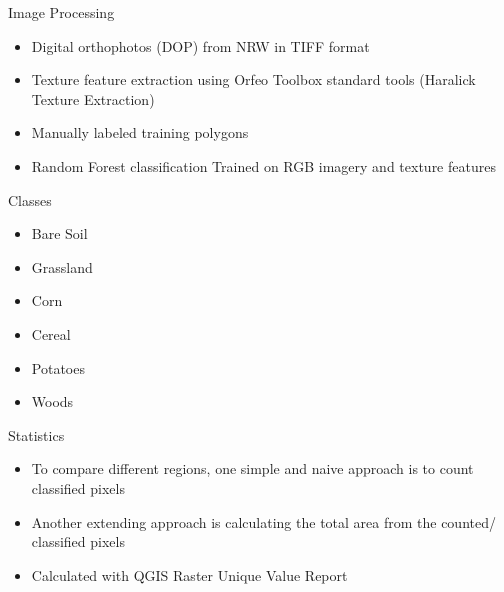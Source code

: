 \documentclass[
  t,%
]{_style/tudelft-beamerposter}
\begin{document}
\begin{frame}
\begin{columns}[onlytextwidth, T]
\begin{column}{}
      \begin{block}{Image Processing}
        \begin{itemize}
          \item Digital orthophotos (DOP) from NRW in TIFF format
          \item Texture feature extraction using Orfeo Toolbox standard tools (Haralick Texture Extraction)
          \item Manually labeled training polygons
          \item Random Forest classification
          \SubItem Trained on RGB imagery and texture features \cite{rs70101074}
        \end{itemize}
      \end{block}

      \begin{multicols}{2}
        \begin{block}{Classes}
          \begin{itemize}
            \item Bare Soil
            \item Grassland
            \item Corn
            \item Cereal
            \item Potatoes
            \item Woods
          \end{itemize}
          \vspace{1.25cm}
        \end{block}

        \begin{block}{Statistics}
            \begin{itemize}
                \item To compare different regions, one simple and naive approach is to count classified pixels
                \item Another extending approach is calculating the total area from the counted/ classified pixels
                \item Calculated with QGIS Raster Unique Value Report
            \end{itemize}
        \end{block}
      \end{multicols}


\end{column}
\end{columns}
\end{frame}
\end{document}
